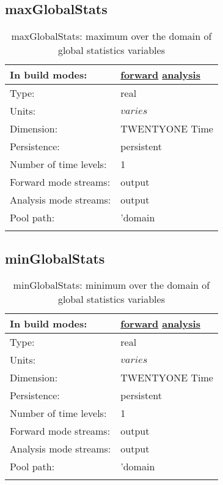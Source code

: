 \subsection[maxGlobalStats]{maxGlobalStats}
\label{subsec:var_sec_amGlobalStats_maxGlobalStats}
\begin{center}
\begin{longtable}{| p{2.0in} | p{4.0in} |}
        \hline 
        In build modes: & \hyperref[subsec:forward_var_tab_amGlobalStats]{forward} \hyperref[subsec:analysis_var_tab_amGlobalStats]{analysis} \\
        \hline 
        Type: & real \\
        \hline 
        Units: & $varies$ \\
        \hline 
        Dimension: & TWENTYONE Time \\
        \hline 
        Persistence: & persistent \\
        \hline 
        Number of time levels: & 1 \\
        \hline 
		 Forward mode streams: &  output \\
        \hline 
		 Analysis mode streams: &  output \\
        \hline 
            Pool path: & 'domain %
 \\
		 \hline 
    \caption{maxGlobalStats: maximum over the domain of global statistics variables}
\end{longtable}
\end{center}
\subsection[minGlobalStats]{minGlobalStats}
\label{subsec:var_sec_amGlobalStats_minGlobalStats}
\begin{center}
\begin{longtable}{| p{2.0in} | p{4.0in} |}
        \hline 
        In build modes: & \hyperref[subsec:forward_var_tab_amGlobalStats]{forward} \hyperref[subsec:analysis_var_tab_amGlobalStats]{analysis} \\
        \hline 
        Type: & real \\
        \hline 
        Units: & $varies$ \\
        \hline 
        Dimension: & TWENTYONE Time \\
        \hline 
        Persistence: & persistent \\
        \hline 
        Number of time levels: & 1 \\
        \hline 
		 Forward mode streams: &  output \\
        \hline 
		 Analysis mode streams: &  output \\
        \hline 
            Pool path: & 'domain %
 \\
		 \hline 
    \caption{minGlobalStats: minimum over the domain of global statistics variables}
\end{longtable}
\end{center}
